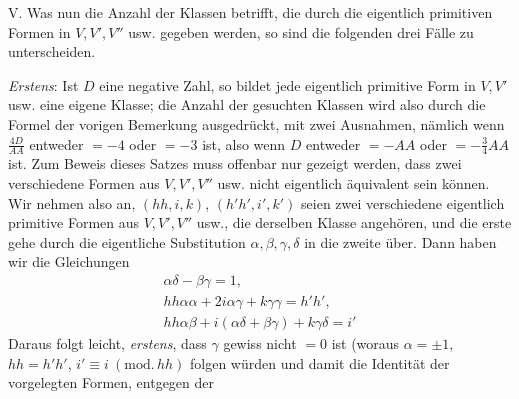 V. Was nun die Anzahl der Klassen betrifft, die durch die eigentlich primitiven Formen in \(V,V',V''\) usw. gegeben werden, so sind die folgenden drei Fälle zu unterscheiden.

\textit{Erstens}: Ist \(D\) eine negative Zahl, so bildet jede eigentlich primitive Form in \(V,V'\) usw. eine eigene Klasse; die Anzahl der gesuchten Klassen wird also durch die Formel der vorigen Bemerkung ausgedrückt, mit zwei Ausnahmen, nämlich wenn \(\frac{4D}{AA}\) entweder \(=-4\) oder \(=-3\) ist, also wenn \(D\) entweder \(=-AA\) oder \(=-\frac34 AA\) ist. Zum Beweis dieses Satzes muss offenbar nur gezeigt werden, dass zwei verschiedene Formen aus \(V,V',V''\) usw. nicht eigentlich äquivalent sein können. Wir nehmen also an, \((hh,i,k)\), \((h'h',i',k')\) seien zwei verschiedene eigentlich primitive Formen aus \(V,V',V''\) usw., die derselben Klasse angehören, und die erste gehe durch die eigentliche Substitution \(\alpha,\beta,\gamma,\delta\) in die zweite über. Dann haben wir die Gleichungen
\[
\begin{gathered}\alpha\delta-\beta\gamma=1,\\ hh\alpha\alpha+2i\alpha\gamma+k\gamma\gamma=h'h',\\ hh\alpha\beta+i(\alpha\delta+\beta\gamma)+k\gamma\delta=i'\end{gathered}
\]
Daraus folgt leicht, \textit{erstens}, dass \(\gamma\) gewiss nicht \(=0\) ist (woraus \(\alpha=\pm1\), \(hh=h'h'\), \(i'\equiv i\ (\mathrm{mod.}\,hh)\) folgen würden und damit die Identität der vorgelegten Formen, entgegen der
